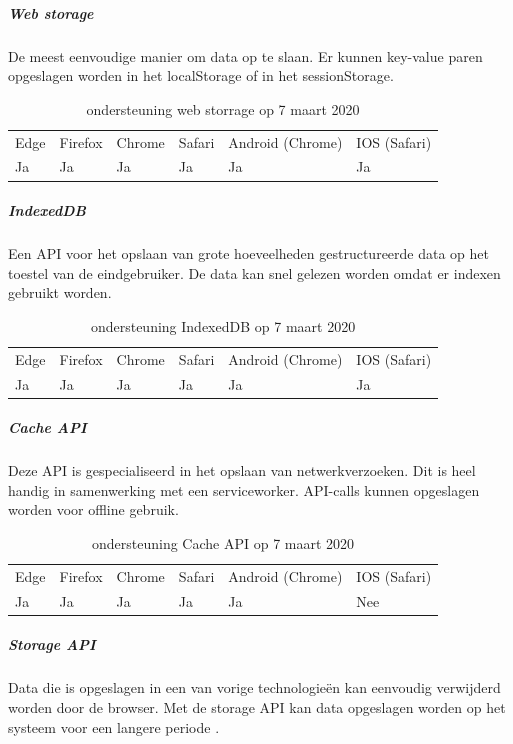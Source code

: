 	\subparagraph{Web storage}
	De meest eenvoudige manier om data op te slaan. Er kunnen key-value paren opgeslagen worden in het localStorage of in het sessionStorage. 
	\autocite{Hickson2016}
	
	\begin{table}[H]
		\centering
		\begin{tabular}{llllll}
			Edge & Firefox & Chrome & Safari & Android (Chrome) & IOS (Safari) \\
			Ja   & Ja      &  Ja     & Ja     & Ja               & Ja          
		\end{tabular}	
		\caption{ondersteuning web storrage op 7 maart 2020}
	\end{table}
	
	
	
	\subparagraph{IndexedDB}
	Een API voor het opslaan van grote hoeveelheden gestructureerde data op het toestel van de eindgebruiker. De data kan snel gelezen worden omdat er indexen gebruikt worden. 
	\autocite{Alabbas2018}
	
	\begin{table}[H]
		\centering
			\begin{tabular}{llllll}
				Edge & Firefox & Chrome & Safari & Android (Chrome) & IOS (Safari) \\
				Ja   & Ja      &  Ja     & Ja     & Ja               & Ja          
			\end{tabular}	
			\caption{ondersteuning IndexedDB op 7 maart 2020}
	\end{table}
	
	
	\subparagraph{Cache API}
	Deze API is gespecialiseerd in het opslaan van netwerkverzoeken. Dit is heel handig in samenwerking met een serviceworker. API-calls kunnen opgeslagen worden voor offline gebruik.
	\autocite{vanKesteren2008}
	
	\begin{table}[H]
		\centering
			\begin{tabular}{llllll}
				Edge & Firefox & Chrome & Safari & Android (Chrome) & IOS (Safari) \\
				Ja   & Ja      &  Ja     & Ja     & Ja               & Nee          
			\end{tabular}	
			\caption{ondersteuning Cache API op 7 maart 2020}
	\end{table}
	
	
	\subparagraph{Storage API}
	Data die is opgeslagen in een van vorige technologieën kan eenvoudig verwijderd worden door de browser. Met de storage API kan data opgeslagen worden op het systeem voor een langere periode .
	\autocite{Mozilla2020b}
	
